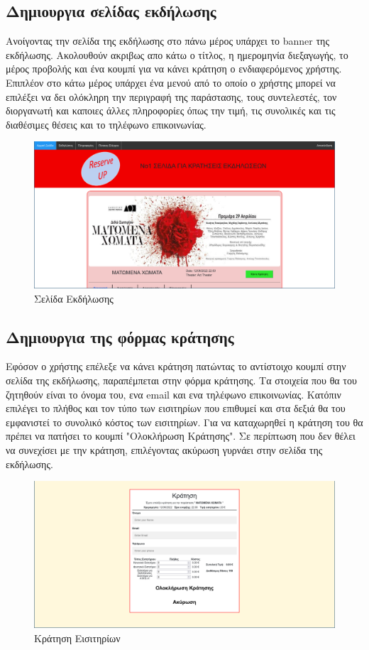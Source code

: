 \documentclass{acmart}
\begin{document}
\subsection*{Δημιουργια σελίδας εκδήλωσης}
Ανοίγοντας την σελίδα της εκδήλωσης στο πάνω μέρος υπάρχει το banner της εκδήλωσης. 
Ακολουθούν ακριβως απο κάτω ο τίτλος, η ημερομηνία διεξαγωγής, το μέρος προβολής και ένα κουμπί 
για να κάνει κράτηση ο ενδιαφερόμενος χρήστης. Επιπλέον στο κάτω μέρος υπάρχει ένα μενού από το 
οποίο ο χρήστης μπορεί να επιλέξει να δει ολόκληρη την περιγραφή της παράστασης, τους συντελεστές, 
τον διοργανωτή και καποιες άλλες πληροφορίες όπως την τιμή, τις συνολικές και τις διαθέσιμες θέσεις 
και το τηλέφωνο επικοινωνίας.
\begin{figure}[H]
       \includegraphics[width=\textwidth]{event.png}
       \caption{Σελίδα Εκδήλωσης}
       \label{fig:event}
\end{figure}
\subsection*{Δημιουργια της φόρμας κράτησης}
Εφόσον ο χρήστης επέλεξε να κάνει κράτηση πατώντας το αντίστοιχο κουμπί στην σελίδα της εκδήλωσης, 
παραπέμπεται στην φόρμα κράτησης. Τα στοιχεία που θα του ζητηθούν είναι το όνομα του, ενα email και 
ενα τηλέφωνο επικοινωνίας. Κατόπιν επιλέγει το πλήθος και τον τύπο των εισιτηρίων που επιθυμεί και στα 
δεξιά θα του εμφανιστεί το συνολικό κόστος των εισιτηρίων. Για να καταχωρηθεί η κράτηση του θα πρέπει να 
πατήσει το κουμπί "Ολοκλήρωση Κράτησης". Σε περίπτωση που δεν θέλει να συνεχίσει με την κράτηση, επιλέγοντας
ακύρωση γυρνάει στην σελίδα της εκδήλωσης.
\begin{figure}[H]
       \includegraphics[width=\textwidth]{reserve.png}
       \caption{Κράτηση Εισιτηρίων}
       \label{fig:reserve}
\end{figure}
\end{document}
